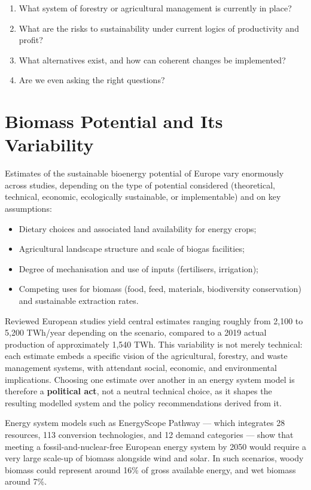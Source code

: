 \begin{enumerate}
    \item What system of forestry or agricultural management is currently in place?
    \item What are the risks to sustainability under current logics of productivity and profit?
    \item What alternatives exist, and how can coherent changes be implemented?
    \item Are we even asking the right questions?
\end{enumerate}

\section{Biomass Potential and Its Variability}

Estimates of the sustainable bioenergy potential of Europe vary enormously across studies, depending on the type of potential considered (theoretical, technical, economic, ecologically sustainable, or implementable) and on key assumptions:

\begin{itemize}
    \item Dietary choices and associated land availability for energy crops;
    \item Agricultural landscape structure and scale of biogas facilities;
    \item Degree of mechanisation and use of inputs (fertilisers, irrigation);
    \item Competing uses for biomass (food, feed, materials, biodiversity conservation) and sustainable extraction rates.
\end{itemize}

Reviewed European studies yield central estimates ranging roughly from 2,100 to 5,200 TWh/year depending on the scenario, compared to a 2019 actual production of approximately 1,540 TWh. This variability is not merely technical: each estimate embeds a specific vision of the agricultural, forestry, and waste management systems, with attendant social, economic, and environmental implications. Choosing one estimate over another in an energy system model is therefore a \textbf{political act}, not a neutral technical choice, as it shapes the resulting modelled system and the policy recommendations derived from it.

Energy system models such as EnergyScope Pathway — which integrates 28 resources, 113 conversion technologies, and 12 demand categories — show that meeting a fossil-and-nuclear-free European energy system by 2050 would require a very large scale-up of biomass alongside wind and solar. In such scenarios, woody biomass could represent around 16\% of gross available energy, and wet biomass around 7\%.

